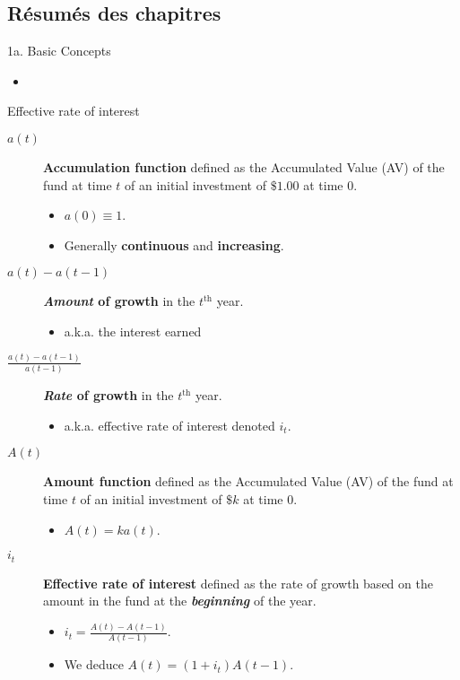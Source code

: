 \subsection{Résumés des chapitres}

\begin{CHPT_SUMM_AUTO}[label = {L.-1a}]{1a. Basic Concepts}
	\begin{itemize}[leftmargin = *]
		\item	
	\end{itemize}

\begin{FORMULA_SUMM}{Effective rate of interest}
\begin{description}
	\item[$a(t)$]	\textbf{Accumulation function} defined as the Accumulated Value (AV) of the fund at time $t$ of an initial investment of $\$1.00$ at time 0.
		\begin{itemize}[leftmargin = *]
		\item	$a(0) \equiv 1$.
		\item	Generally \textbf{continuous} and \textbf{increasing}.
		\end{itemize}
	\item[$a(t) - a(t - 1)$]	\textbf{\textit{Amount} of growth} in the $t^{\text{th}}$ year.
		\begin{itemize}[leftmargin = *]
		\item	a.k.a. the interest earned
		\end{itemize}
	\item[$\frac{a(t) - a(t - 1)}{a(t - 1)}$]	\textbf{\textit{Rate} of growth} in the $t^{\text{th}}$ year.
		\begin{itemize}[leftmargin = *]
		\item	a.k.a. effective rate of interest denoted $i_{t}$.
		\end{itemize}
	\item[$A(t)$]	\textbf{Amount function} defined as the Accumulated Value (AV) of the fund at time $t$ of an initial investment of $\$k$ at time 0.
		\begin{itemize}[leftmargin = *]
		\item	$A(t) = k a(t)$.
		\end{itemize}
	\item[$i_{t}$]	\textbf{Effective rate of interest} defined as the rate of growth based on the amount in the fund at the \textbf{\textit{beginning}} of the year.
		\begin{itemize}[leftmargin = *]
		\item	$i_{t} = \frac{A(t) - A(t - 1)}{A(t - 1)}$.
		\item	We deduce $A(t) = (1 + i_{t})A(t - 1)$.
		\end{itemize}
\end{description}
\end{FORMULA_SUMM}


\end{CHPT_SUMM_AUTO}
